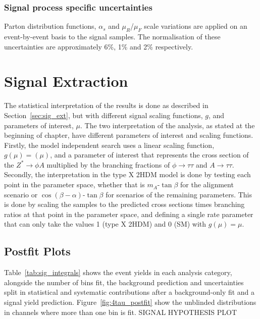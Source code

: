\subsubsection{Signal process specific uncertainties}
Parton distribution functions, $\alpha_s$ and $\mu_{R}$/$\mu_{F}$ scale variations are applied on an event-by-event basis to the signal samples.
The normalisation of these uncertainties are approximately 6\%, 1\% and 2\% respectively.

\section{Signal Extraction}

The statistical interpretation of the results is done as described in Section~\ref{sec:sig_ext}, but with different signal scaling functions, $g$, and parameters of interest, $\mu$.
The two interpretation of the analysis, as stated at the beginning of chapter, have different parameters of interest and scaling functions. \\

Firstly, the model independent search uses a linear scaling function, $g(\mu)=(\mu)$, and a parameter of interest that represents the cross section of the $Z^{*}\rightarrow \phi A$ multiplied by the branching fractions of $\phi\rightarrow\tau\tau$ and $A\rightarrow\tau\tau$.
Secondly, the interpretation in the type X \ac{2HDM} model is done by testing each point in the parameter space, whether that is $m_{A}$-$\tan\beta$ for the alignment scenario or $\cos(\beta-\alpha)$-$\tan\beta$ for scenarios of the remaining parameters. 
This is done by scaling the samples to the predicted cross sections times branching ratios at that point in the parameter space, and defining a single rate parameter that can only take the values 1 (type X \ac{2HDM}) and 0 (\ac{SM}) with $g(\mu)=\mu$.

\subsection{Postfit Plots}

Table~\ref{tab:sig_integrals} shows the event yields in each analysis category, alongside the number of bins fit, the background prediction and uncertainties split in statistical and systematic contributions after a background-only fit and a signal yield prediction.
Figure~\ref{fig:4tau_postfit} show the unblinded distributions in channels where more than one bin is fit.
SIGNAL HYPOTHESIS PLOT \\

